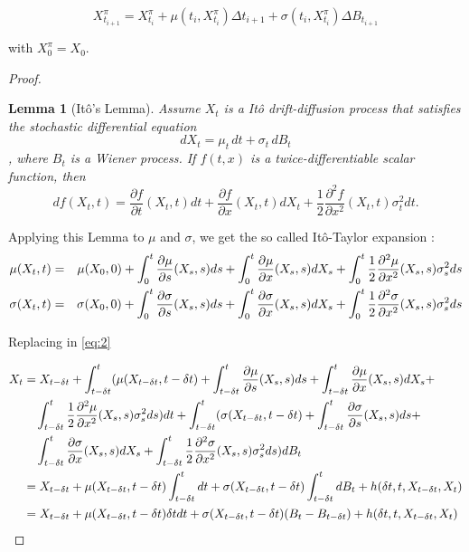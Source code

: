 \documentclass[english,11pt,openany]{article}
\theoremstyle{definition}
\theoremstyle{plain}
\newtheorem{Lemma}[Th]{Lemma}
\theoremstyle{definition}
\begin{document}
	$$X^\pi_{t_{i + 1}} =  X^\pi_{t_i} + \mu(t_i,X^\pi_{t_i})\Delta t_{i + 1} + \sigma (t_i, X^\pi_{t_i}) \Delta B_{t_{i + 1}}$$
	
	with $X^\pi_0 = X_0$.
	
	
	\begin{proof}
		
		\begin{Lemma}[Itô's Lemma]
			Assume $X_t$ is a Itô drift-diffusion process that satisfies the stochastic differential equation
			$$dX_{t}=\mu _{t}\,dt+\sigma _{t}\,dB_{t}$$,
			where $B_t$ is a Wiener process. If $f(t,x)$ is a twice-differentiable scalar function, then 
			$$ df(X_{t},t)={\frac  {\partial f}{\partial t}}(X_{t},t)dt+{\frac  {\partial f}{\partial x}}(X_{t},t)dX_{t}+{\frac  {1}{2}}{\frac  {\partial ^{2}f}{\partial x^{2}}}(X_{t},t)\sigma _{t}^{2}dt.$$
		\end{Lemma}
		
		
		Applying this Lemma to $\mu$ and $\sigma$, we get the so called Itô-Taylor expansion :
		\begin{eqnarray}
		\mu (X_{t},t) & = & \mu(X_0, 0) + \int_{0}^{t}{\frac  {\partial \mu}{\partial s}}(X_s,s)ds + \int_{0}^{t}{\frac  {\partial \mu}{\partial x}}(X_s,s)dX_s + \int_{0}^{t}{\frac  {1}{2}}{\frac  {\partial ^{2}\mu}{\partial x^{2}}}(X_s,s)\sigma _{s}^{2}ds \notag \\
		\sigma (X_{t},t) & = & \sigma(X_0, 0) + \int_{0}^{t}{\frac  {\partial \sigma}{\partial s}}(X_s,s)ds + \int_{0}^{t}{\frac  {\partial \sigma}{\partial x}}(X_s,s)dX_s + \int_{0}^{t}{\frac  {1}{2}}{\frac  {\partial ^{2}\sigma}{\partial x^{2}}}(X_s,s)\sigma _{s}^{2}ds \notag
		\end{eqnarray}
		
		Replacing in \eqref{eq:2}
		
		\begin{align}
		X_t& =  X_{t - \delta t} + \int_{t - \delta t}^{t}(\mu(X_{t - \delta t}, t - \delta t) +  \int_{t - \delta t}^{t}{\frac  {\partial \mu}{\partial s}}(X_s,s)ds + \int_{t - \delta t}^{t}{\frac  {\partial \mu}{\partial x}}(X_s,s)dX_s + \notag \\
		&\quad \int_{t - \delta t}^{t}{\frac  {1}{2}}{\frac  {\partial ^{2}\mu}{\partial x^{2}}}(X_s,s)\sigma _{s}^{2}ds)dt  + \int_{t - \delta t}^{t}(\sigma(X_{t - \delta t}, t - \delta t) + \int_{t - \delta t}^{t}{\frac  {\partial \sigma}{\partial s}}(X_s,s)ds + \notag \\
		&\quad\int_{t - \delta t}^{t}{\frac  {\partial \sigma}{\partial x}}(X_s,s)dX_s + \int_{t - \delta t}^{t}{\frac  {1}{2}}{\frac  {\partial ^{2}\sigma}{\partial x^{2}}}(X_s,s)\sigma _{s}^{2}ds)dB_t  \notag \\
		&=  X_{t - \delta t} + \mu(X_{t - \delta t}, t - \delta t)\int_{t - \delta t}^{t}dt + \sigma(X_{t - \delta t}, t - \delta t)\int_{t - \delta t}^{t}dB_t + h(\delta t, t, X_{t - \delta t}, X_t) \notag \\
		&=  X_{t - \delta t} + \mu(X_{t - \delta t}, t - \delta t)\delta tdt + \sigma(X_{t - \delta t}, t - \delta t)(B_{t} - B_{t - \delta t}) + h(\delta t, t, X_{t - \delta t}, X_t) \notag
		\end{align} 
		

\end{proof}
\end{document}
